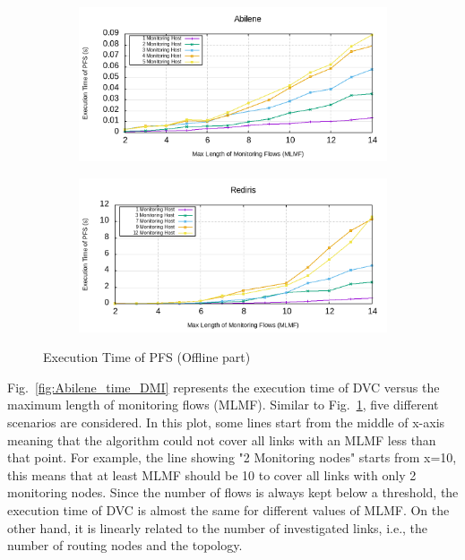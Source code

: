 \documentclass[10pt, journal, letterpaper]{IEEEtran}
\begin{document}
\begin{figure}
    \begin{subfigure}{0.49\columnwidth}
       \centering
        \includegraphics[width=\columnwidth]{img/eval_Abilene_Max_Length_of_Routes_Execution_time_ILP.png}
    \end{subfigure}
    \begin{subfigure}{0.49\columnwidth}
      \centering
      \includegraphics[width=\columnwidth]{img/eval_Rediris_Max_Length_of_Routes_Execution_time_ILP.png}
    \end{subfigure}
    \caption{Execution Time of PFS (Offline part)}
    \label{fig:Abilene_time_PFS}
\end{figure}

Fig.~\ref{fig:Abilene_time_DMI} represents the execution time of DVC versus the maximum length of monitoring flows (MLMF). Similar to Fig.~\ref{fig:Abilene_time_PFS}, five different scenarios are considered. In this plot, some lines start from the middle of x-axis meaning that the algorithm could not cover all links with an MLMF less than that point. For example, the line showing "2 Monitoring nodes" starts from x=10, this means that at least MLMF should be 10 to cover all links with only 2 monitoring nodes. Since the number of flows is always kept below a threshold, the execution time of DVC is almost the same for different values of MLMF. On the other hand, it is linearly related to the number of investigated links, i.e., the number of routing nodes and the topology.
\end{document}
